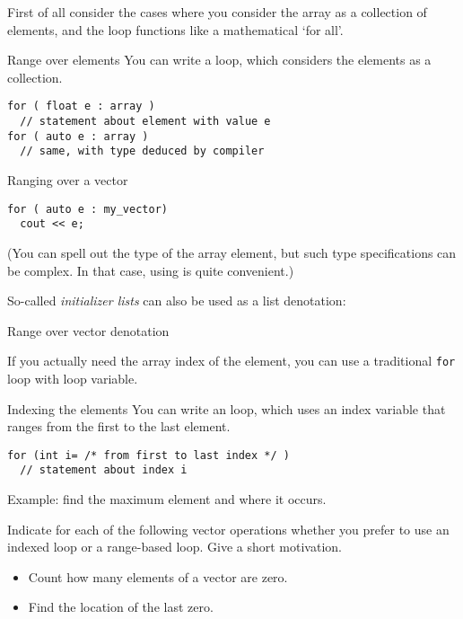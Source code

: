 First of all consider the cases where you consider the array as a
collection of elements, and the loop functions like a mathematical
`for all'.

\begin{block}{Range over elements}
  \label{sl:array-range}
  You can write a  loop, which
  considers the elements as a collection.
\begin{lstlisting}
for ( float e : array )
  // statement about element with value e
for ( auto e : array )
  // same, with type deduced by compiler
\end{lstlisting}

\end{block}

\begin{block}{Ranging over a vector}
  \label{sl:vector-range}
\begin{lstlisting}
for ( auto e : my_vector)
  cout << e;
\end{lstlisting}
\end{block}

(You can spell out the type of the array element, but such type
specifications can be complex. In that case, using  is
quite convenient.)

So-called \emph{initializer lists}
can also be used as a list denotation:

\begin{block}{Range over vector denotation}
  \label{sl:range-denote}
\end{block}

If you actually need the array index of the element, you can use a
traditional \lstinline{for} loop with loop variable.

\begin{block}{Indexing the elements}
  \label{sl:index-range}
  You can write an  loop, which uses an
  index variable that ranges from the first to the last element.
\begin{lstlisting}
for (int i= /* from first to last index */ )
  // statement about index i
\end{lstlisting}
Example: find the maximum element and where it occurs.
%
\end{block}

\begin{exercise}
  \label{ex:range-for}
  Indicate for each of the following vector operations whether you
  prefer to use an indexed loop or a range-based loop. Give a short
  motivation.
  \begin{itemize}
  \item Count how many elements of a vector are zero.
  \item Find the location of the last zero.
  \end{itemize}
\end{exercise}


